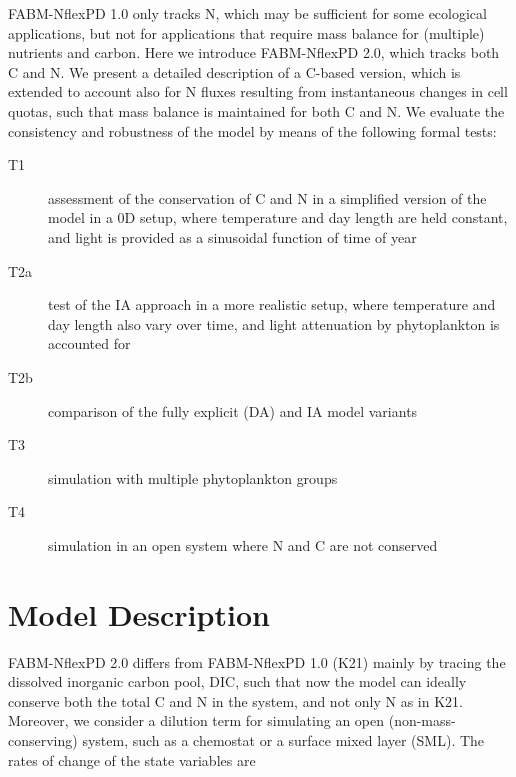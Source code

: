 \documentclass[gmd, manuscript]{copernicus}
\newcommand{\onur}[1]{\textcolor{blue}{\{Onur: #1\}}}
\newcommand{\markus}[1]{\textcolor{blue}{\{Markus: #1\}}}
\begin{document}
FABM-NflexPD 1.0 only tracks N, which may be sufficient for some ecological applications, but not for applications that require mass balance for (multiple) nutrients and carbon.  Here we introduce FABM-NflexPD 2.0, which tracks both C and N\@.  We present a detailed description of a C-based version, which is extended to account also for N fluxes resulting from instantaneous changes in cell quotas, such that mass balance is maintained for both C and N\@.  We evaluate the consistency and robustness of the model by means of the following formal tests:
\begin{description}
 \item [T1] assessment of the conservation of C and N in a simplified version of the model in a 0D setup, where temperature and day length are held constant, and light is provided as a sinusoidal function of time of year
 \item [T2a] test of the IA approach in a more realistic setup, where temperature and day length also vary over time, and light attenuation by phytoplankton is accounted for
 \item [T2b] comparison of the fully explicit (DA) and IA model variants
 \item [T3] simulation with multiple phytoplankton groups
 \item [T4] simulation in an open system where N and C are not conserved
\end{description}



\section{Model Description}


FABM-NflexPD 2.0 differs from FABM-NflexPD 1.0 (K21) 
mainly by tracing the dissolved inorganic carbon pool, DIC, such that now the model can ideally conserve both the total C and N in the system, and not only N as in K21. Moreover, we consider a dilution term for simulating an open (non-mass-conserving) system, such as a chemostat or a surface mixed layer (SML). The rates of change of the state variables are
\end{document}
